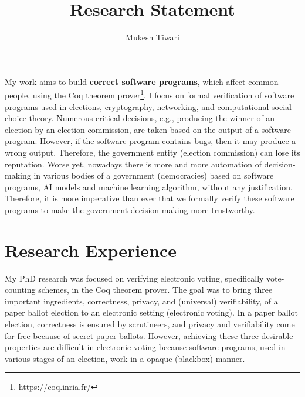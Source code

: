 \documentclass[a4paper]{article}
\title{Research Statement}
\author{Mukesh Tiwari}
\date{}
\begin{document}
\fontsize{12}{15}
\selectfont
\maketitle

My work aims to build \textbf{correct software programs}, which affect 
common people, using the Coq theorem prover\footnote{\url{https://coq.inria.fr/}}. 
I focus on formal verification of software programs used in elections, cryptography, 
networking, and computational social choice theory. Numerous critical decisions, e.g., 
producing the winner of an election by an election commission,
are taken based on the output of a software program. However, if the
software program contains bugs, then it may produce a wrong 
output. Therefore, the government entity (election commission) can 
lose its reputation. Worse yet, nowadays there is more and more automation of decision-making 
in various bodies of a government (democracies) based on software programs,
AI models and machine learning algorithm, without any justification.
Therefore, it is more imperative than ever  that  we formally verify 
these software programs to make the government decision-making more trustworthy. 


\section{Research Experience}
My PhD research was focused on verifying electronic voting, specifically vote-counting schemes, in 
the Coq theorem prover. The goal was to 
bring  three important ingredients, correctness, privacy, and (universal) verifiability, of a paper ballot election to 
an electronic setting (electronic voting). In a paper ballot election, correctness is
ensured by scrutineers, and privacy and verifiability  
come for free because of secret paper ballots.  However, achieving these three desirable properties 
are difficult in 
electronic voting because software programs, used in 
various stages of an election, work in a opaque (blackbox) manner. 
\end{document}
